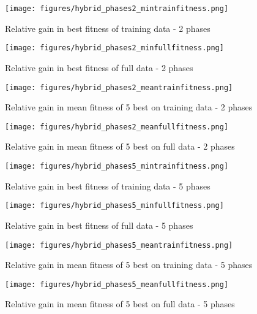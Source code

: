 \begin{figure*}
    \centering
    \begin{subfigure}{0.6\textwidth}
    \centering
    \texttt{[image: figures/hybrid\_phases2\_mintrainfitness.png]}
    \caption{Relative gain in best fitness of training data - 2 phases}
    \end{subfigure}%
    \begin{subfigure}{0.6\textwidth}
    \centering
     \texttt{[image: figures/hybrid\_phases2\_minfullfitness.png]}
    \caption{Relative gain in best fitness of full data - 2 phases}
    \end{subfigure}
    \begin{subfigure}{0.6\textwidth}
    \centering
    \texttt{[image: figures/hybrid\_phases2\_meantrainfitness.png]}
    \caption{Relative gain in mean fitness of 5 best on training data - 2 phases}
    \end{subfigure}%
    \begin{subfigure}{0.6\textwidth}
    \centering
    \texttt{[image: figures/hybrid\_phases2\_meanfullfitness.png]}
    \caption{Relative gain in mean fitness of 5 best on full data - 2 phases}
    \label{fig:2phase}
    \end{subfigure}
    \begin{subfigure}{0.6\textwidth}
    \centering
        \texttt{[image: figures/hybrid\_phases5\_mintrainfitness.png]}
        \caption{Relative gain in best fitness of training data - 5 phases}
    \end{subfigure}%
    \begin{subfigure}{0.6\textwidth}
    \centering
        \texttt{[image: figures/hybrid\_phases5\_minfullfitness.png]}
        \caption{Relative gain in best fitness of full data - 5 phases}
    \end{subfigure}
        \begin{subfigure}{0.6\textwidth}
    \centering
        \texttt{[image: figures/hybrid\_phases5\_meantrainfitness.png]}
        \caption{Relative gain in mean fitness of 5 best on training data - 5 phases}
    \end{subfigure}%
    \begin{subfigure}{0.6\textwidth}
    \centering
        \texttt{[image: figures/hybrid\_phases5\_meanfullfitness.png]}
        \caption{Relative gain in mean fitness of 5 best on full data - 5 phases}
        \label{fig:5phase}

\end{subfigure}
\end{figure*}

